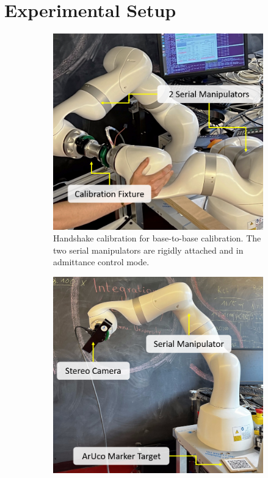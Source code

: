 \section{Experimental Setup}
\label{c1:sec:experimental_setup}
\begin{figure}
     \centering
     \begin{subfigure}[b]{0.3\textwidth}
         \centering
         \includegraphics[width=\textwidth]{fig/handshake.png}
         \caption{Handshake calibration for base-to-base calibration. The two serial manipulators are rigidly attached and in admittance control mode.}
         \label{c1:fig:handshake}
     \end{subfigure}
     \hfill
     \begin{subfigure}[b]{0.3\textwidth}
         \centering
         \includegraphics[width=\textwidth]{fig/eye_in_hand.png}

\end{subfigure}
\end{figure}
